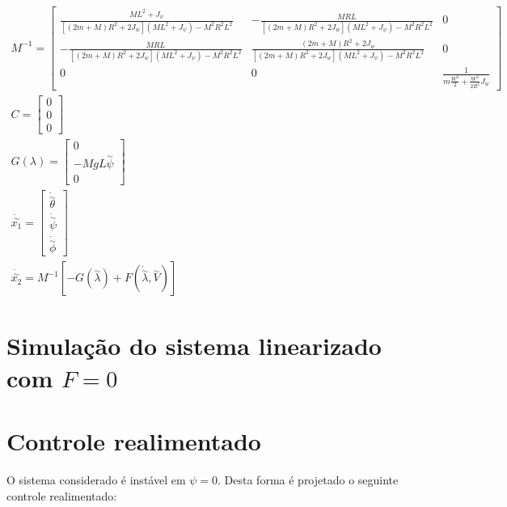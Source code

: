 \documentclass[10pt]{article}
\begin{document}
\begin{equation}
\begin{gathered}
    M^{-1} =
    \begin{bmatrix}
        \frac{ML^2 + J_\psi}{[(2m + M)R^2 + 2J_w](ML^2 + J_\psi) - M^2R^2L^2} & -\frac{MRL}{[(2m + M)R^2 + 2J_w](ML^2 + J_\psi) - M^2R^2L^2} & 0 \\
        -\frac{MRL}{[(2m + M)R^2 + 2J_w](ML^2 + J_\psi) - M^2R^2L^2} & \frac{(2m + M)R^2 + 2J_w}{[(2m + M)R^2 + 2J_w](ML^2 + J_\psi) - M^2R^2L^2} & 0 \\
        0 & 0 & \frac{1}{m\frac{W^2}{2} + \frac{W^2}{2R^2}J_w}
    \end{bmatrix} \\
    C =
    \begin{bmatrix}
        0 \\ 0 \\ 0
    \end{bmatrix} \\
    G(\lambda) =
    \begin{bmatrix}
        0 \\ -MgL\overset{\sim}{\psi} \\ 0
    \end{bmatrix} \\
    \dot{\overset{\sim}{x_1}} = \begin{bmatrix}
        \dot{\overset{\sim}{\theta}} \\
        \dot{\overset{\sim}{\psi}} \\
        \dot{\overset{\sim}{\phi}}
    \end{bmatrix} \\
    \dot{\overset{\sim}{x_2}} = M^{-1} \left[ - G( \overset{\sim}{\lambda} ) + F( \dot{\overset{\sim}{\lambda}} , \overset{\sim}{V} ) \right]
\end{gathered}
\end{equation}

\section{Simulação do sistema linearizado com $F=0$}

\section{Controle realimentado}

\quad O sistema considerado é instável em $\psi = 0$.
Desta forma é projetado o seguinte controle realimentado:
\end{document}
